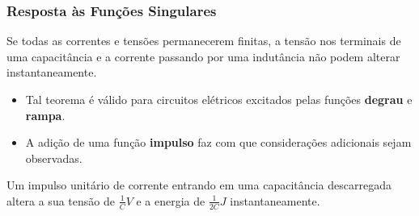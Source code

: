 \documentclass[mathserif,usenames,dvipsnames]{beamer}
\begin{document}
\begin{frame}
\frametitle{Resposta às Funções Singulares}
	\begin{theorem}
		Se todas as correntes e tensões permanecerem finitas, a tensão nos terminais de uma capacitância e a corrente passando por uma indutância não podem alterar instantaneamente.
	\end{theorem}
	\begin{itemize}
		\item Tal teorema é válido para circuitos elétricos excitados pelas funções \textbf{degrau} e \textbf{rampa}.
		\item A adição de uma função \textbf{impulso} faz com que considerações adicionais sejam observadas.
	\end{itemize}
	\begin{theorem}
		Um impulso unitário de corrente entrando em uma capacitância descarregada altera a sua tensão de $\frac{1}{C}V$ e a energia de $\frac{1}{2C}J$ instantaneamente.
	\end{theorem}
\end{frame}
\end{document}
